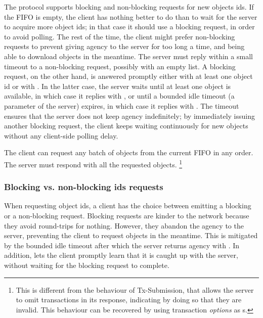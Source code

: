 The protocol supports blocking and non-blocking requests for new objects ids. If
the FIFO is empty, the client has nothing better to do than to wait for the
server to acquire more object ids; in that case it should use a blocking
request, in order to avoid polling. The rest of the time, the client might
prefer non-blocking requests to prevent giving agency to the server for too long
a time, and being able to download objects in the meantime. The server must
reply within a small timeout to a non-blocking request, possibly with an empty
list. A blocking request, on the other hand, is answered promptly either with at
least one object id or with \MsgAwaitReply{}. In the latter case, the server
waits until at least one object is available, in which case it replies with
\MsgReplyObjIds{}, or until a bounded idle timeout (a parameter of the server)
expires, in which case it replies with \MsgServerIdle{}. The timeout ensures that
the server does not keep agency indefinitely; by immediately issuing another
blocking request, the client keeps waiting continuously for new objects without
any client-side polling delay.

The client can request any batch of objects from the current FIFO in any order.
The server must respond with all the requested objects.%
%
\footnote{This is different from the behaviour of Tx-Submission, that allows the
server to omit transactions in its response, indicating by doing so that they
are invalid. This behaviour can be recovered by using transaction {\em options}
as s.}

%

\subsubsection{Blocking vs. non-blocking ids requests}

When requesting object ids, a client has the choice between emitting a blocking or a non-blocking request.
Blocking requests are kinder to the network because they avoid round-trips for nothing.
However, they abandon the agency to the server, preventing the client to request objects in the meantime.
This is mitigated by the bounded idle timeout after which the server returns agency with \MsgServerIdle{}.
In addition, \MsgAwaitReply{} lets the client promptly learn that it is caught up with the server, without waiting for the blocking request to complete.

